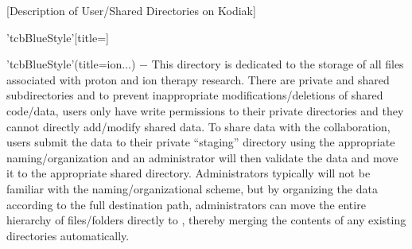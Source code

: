 [Description of User/Shared Directories on Kodiak]
\begin{tcbenvironment}'tcbBlueStyle'[title=]
\begin{tcbparagraph}'tcbBlueStyle'(title=\dirsep ion\dirsep$\dots$)%
	$\boldsymbol{-}$ This directory is dedicated to the storage of all files associated with proton and ion therapy research.  There are private and shared subdirectories and to prevent inappropriate modifications/deletions of shared code/data, users only have write permissions to their private directories and they cannot directly add/modify shared data.  To share data with the collaboration, users submit the data to their private ``staging'' directory using the appropriate naming/organization and an administrator will then validate the data and move it to the appropriate shared directory.  Administrators typically will not be familiar with the naming/organizational scheme, but by organizing the data according to the full destination path, administrators can move the entire hierarchy of files/folders directly to , thereby merging the contents of any existing directories automatically.\\[\tcbparskip]
	

\end{tcbparagraph}
\end{tcbenvironment}
